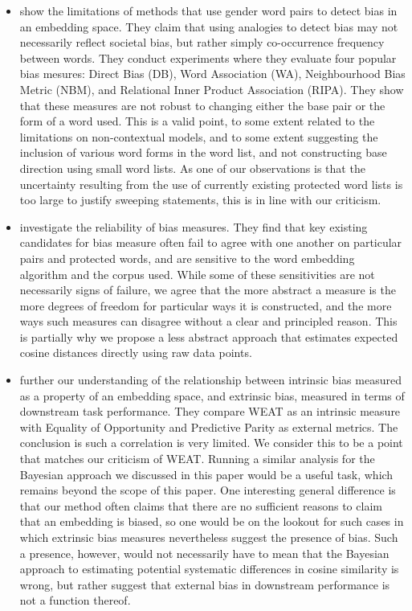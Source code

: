 \documentclass{clv3}
\begin{document}
\begin{itemize}
\item \citet{zhang2020robustness} show the limitations of methods that use gender word pairs to detect bias in an embedding space. They claim that using analogies to detect bias may not necessarily reflect societal bias, but rather simply co-occurrence frequency between words. They conduct experiments where they evaluate four popular bias mesures: Direct Bias (DB), Word Association (WA), Neighbourhood Bias Metric (NBM), and Relational Inner Product Association (RIPA). They show that these measures are not robust to changing either the base pair or the form of a word used. This is  a valid point, to some extent related to the limitations on non-contextual models, and to some extent suggesting the inclusion of various word forms in the word list, and not constructing base direction using small word lists. As one of our observations is that the uncertainty resulting from the use of currently existing protected word lists is too large to justify sweeping statements, this is in line with our criticism. 


\item \citet{Du2021Assessing} investigate the reliability of bias measures. They find that key existing candidates for bias measure often fail to agree with one another on particular pairs and protected words, and are sensitive to the word embedding algorithm and the corpus used. While some of these sensitivities are not necessarily signs of failure, we agree that the more abstract a measure is the more degrees of freedom for particular ways it is constructed, and the more ways such measures can disagree without a clear and principled reason. This is partially why we propose a less abstract approach that estimates expected cosine distances directly using raw data points. 


\item \citet{Goldfarb2021BiasNotCorrelate} further our  understanding of  the relationship between intrinsic bias measured as a property of an embedding space, and extrinsic bias, measured in terms of  downstream task performance. They compare  WEAT as an intrinsic measure with Equality of Opportunity and Predictive Parity as external metrics.  The conclusion is such a  correlation is very limited. We consider this to be a point that matches our criticism of WEAT. Running a similar analysis for the Bayesian approach we discussed in this paper would be a useful task, which remains beyond the scope of this paper. One interesting general difference is that our method often claims that there are no sufficient  reasons to claim that an embedding is biased, so one would be on the lookout for such cases in which extrinsic bias measures nevertheless suggest the presence of bias. Such a presence, however, would not necessarily have to mean that the Bayesian approach to estimating potential systematic differences in cosine similarity is wrong, but rather suggest that external bias in downstream performance is not a function thereof.



\end{itemize}
\end{document}
